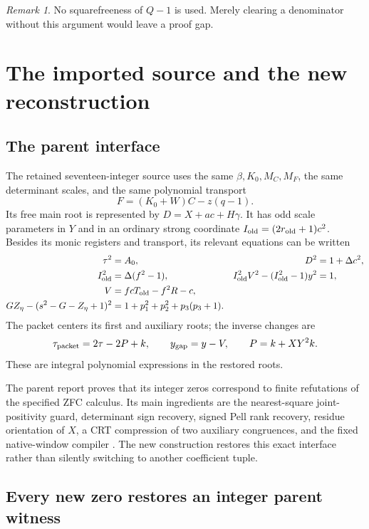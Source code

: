 \documentclass[11pt]{article}
\theoremstyle{remark}
\newtheorem{remark}[theorem]{Remark}
\begin{document}
\begin{remark}
No squarefreeness of \(Q-1\) is used. Merely clearing a denominator
without this argument would leave a proof gap.
\end{remark}

\section{The imported source and the new reconstruction}

\subsection{The parent interface}

The retained seventeen-integer source uses the same \(\beta,K_0,M_C,M_F\),
the same determinant scales, and the same polynomial transport
\[
 F=(K_0+W)C-z(q-1).
\]
Its free main root is represented by \(D=X+ac+H\gamma\).
It has odd scale parameters in \(Y\) and in an ordinary strong coordinate
\(I_{\rm old}=(2r_{\rm old}+1)c^2\).
Besides its monic registers and transport, its relevant equations can be
written
\begin{align}
 \tau^2&=A_0,&D^2&=1+\Delta c^2,\nonumber\\
 I_{\rm old}^2&=\Delta(f^2-1),&
 I_{\rm old}^2V^2-(I_{\rm old}^2-1)y^2&=1,                  \label{eq:parentnorms}\\
 V&=fcT_{\rm old}-f^2R-c,\nonumber\\
 GZ_\eta-(s^2-G-Z_\eta+1)^2
    &=1+p_1^2+p_2^2+p_3(p_3+1).                           \label{eq:parentguard}
\end{align}
The packet centers its first and auxiliary roots; the inverse changes are
\[
 \tau_{\rm packet}=2\tau-2P+k,\qquad
 y_{\rm gap}=y-V,\qquad P=k+XY^2k.
\]
These are integral polynomial expressions in the restored roots.

The parent report proves that its integer zeros correspond to finite
refutations of the specified ZFC calculus. Its main ingredients are
the nearest-square joint-positivity guard, determinant sign recovery,
signed Pell rank recovery, residue orientation of \(X\), a CRT
compression of two auxiliary congruences, and the fixed native-window
compiler \cite{parent,source34,source70,source71}.
The new construction restores this exact interface rather than silently
switching to another coefficient tuple.

\subsection{Every new zero restores an integer parent witness}
\end{document}
